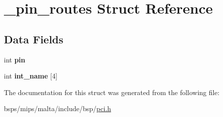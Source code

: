 \hypertarget{struct__pin__routes}{}\section{\+\_\+pin\+\_\+routes Struct Reference}
\label{struct__pin__routes}
\subsection*{Data Fields}
\begin{DoxyCompactItemize}
\item 
\mbox{\label{struct__pin__routes_a39dfafb1eed32a0eddc2008bbb01b599}} 
int {\bfseries pin}
\item 
\mbox{\label{struct__pin__routes_af37c677a22f5edb42c7f86d8ef9339c2}} 
int {\bfseries int\+\_\+name} \mbox{[}4\mbox{]}
\end{DoxyCompactItemize}


The documentation for this struct was generated from the following file\+:\begin{DoxyCompactItemize}
\item 
bsps/mips/malta/include/bsp/\mbox{\hyperlink{bsps_2mips_2malta_2include_2bsp_2pci_8h}{pci.\+h}}\end{DoxyCompactItemize}
